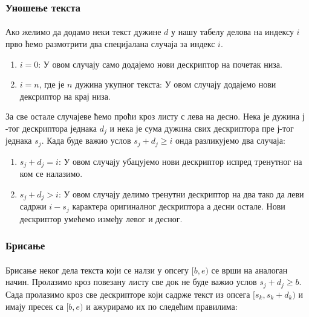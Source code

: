 \documentclass[12pt,oneside]{memoir}
\begin{document}
\subsubsection{Уношење текста}
\paragraph{}
Ако желимо да додамо неки текст дужине \(d\) у нашу табелу делова на индексу \(i\) прво ћемо
размотрити два специјалана случаја за индекс \(i\).

\begin{enumerate}
	\item \(i=0\): У овом случају само додајемо нови дескриптор на почетак низа.
	\item \(i=n\), где је \(n\) дужина укупног текста: У овом случају додајемо нови дексриптор 
	на крај низа.
\end{enumerate}

За све остале случајеве ћемо проћи кроз листу с лева на десно. Нека је дужина \(ј\)-тог
дескриптора једнака \(d_j\) и нека је сума дужина свих дескриптора пре \(ј\)-тог једнака 
\(s_j\). Када буде важио услов \(s_j + d_j \geq i\) онда разликујемо два случаја:

\begin{enumerate}
	\item \(s_j + d_j = i\): У овом случају убацујемо нови дескриптор испред тренутног на ком се
	налазимо.
	\item \(s_j + d_j > i\): У овом случају делимо тренутни дескриптор на два тако
	да леви садржи \(i - s_j\) карактера оригиналног дескриптора а десни остале.
	Нови дескриптор умећемо између левог и десног.
\end{enumerate}

\subsubsection{Брисање}
\paragraph{}
Брисање неког дела текста који се налзи у опсегу \([b, e)\) се врши на аналоган начин.
Пролазимо кроз повезану листу све док не буде важио услов \(s_j + d_j \geq b\). Сада пролазимо
кроз све дескрипторе који садрже текст из опсега \([s_k, s_k+d_k)\) и имају пресек са \([b, e)\)
и ажурирамо их по следећим правилима:
\end{document}
